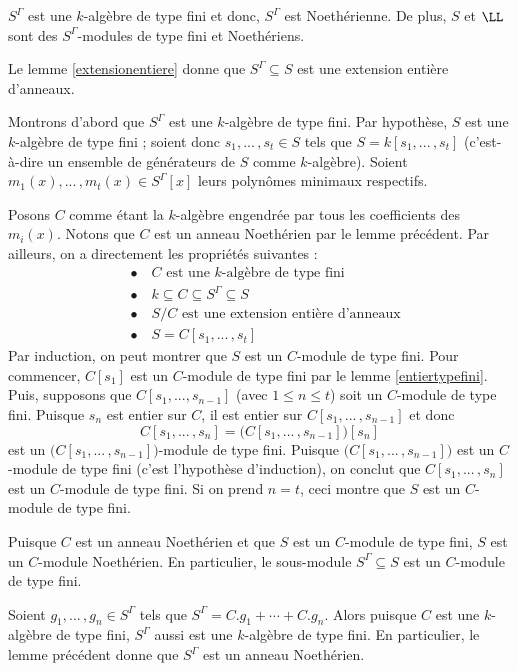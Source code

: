 \begin{Lem} \label{toutestnoetherien} $S^\Gamma$ est une $k$-algèbre de type fini et donc, $S^\Gamma$ est Noethérienne. De plus, $S$ et $\LL$ sont des $S^\Gamma$-modules de type fini et Noethériens.
\begin{pre} Le lemme \ref{extensionentiere} donne que $S^\Gamma \subseteq S$ est une extension entière d'anneaux.  

Montrons d'abord que $S^\Gamma$ est une $k$-algèbre de type fini. Par hypothèse, $S$ est une $k$-algèbre de type fini ; soient donc $s_1,...\,,s_t \in S$ tels que $S = k[s_1,...\,, s_t]$ (c'est-à-dire un ensemble de générateurs de $S$ comme $k$-algèbre). Soient $m_1(x),...\,,m_t(x) \in S^\Gamma [x]$ leurs polynômes minimaux respectifs.

Posons $C$ comme étant la $k$-algèbre engendrée par tous les coefficients des $m_i(x)$. Notons que $C$ est un anneau Noethérien par le lemme précédent. Par ailleurs, on a directement les propriétés suivantes :
\begin{align*}
&\bullet \quad C\text{ est une } k\text{-algèbre de type fini}\\
&\bullet \quad k \subseteq C \subseteq S^\Gamma \subseteq S\\
&\bullet \quad S / C \text{ est une extension entière d'anneaux}\\
&\bullet \quad S = C[s_1,...\,,s_t]
\end{align*}
Par induction, on peut montrer que $S$ est un $C$-module de type fini. Pour commencer, $C[s_1]$ est un $C$-module de type fini par le lemme \ref{entiertypefini}. Puis, supposons que $C[s_1,...,s_{n-1}]$ (avec $1 \leq n \leq t$) soit un $C$-module de type fini. Puisque $s_n$ est entier sur $C$, il est entier sur $C[s_1,...\,,s_{n-1}]$ et donc
$$ C[s_1,...\,, s_n] = \big(C[s_1,...\,,s_{n-1}]\big)[s_n] $$
est un $\big(C[s_1,...\,,s_{n-1}]\big)$-module de type fini. Puisque $\big(C[s_1,...\,,s_{n-1}]\big)$ est un $C$-module de type fini (c'est l'hypothèse d'induction), on conclut que $C[s_1,...\,, s_n]$ est un $C$-module de type fini. Si on prend $n = t$, ceci montre que $S$ est un $C$-module de type fini.

Puisque $C$ est un anneau Noethérien et que $S$ est un $C$-module de type fini, $S$ est un $C$-module Noethérien. En particulier, le sous-module $S^\Gamma \subseteq S$ est un $C$-module de type fini.

Soient $g_1,...\,,g_n \in S^\Gamma$ tels que $S^\Gamma = C.g_1 + \cdots + C.g_n$. Alors puisque $C$ est une $k$-algèbre de type fini, $S^\Gamma$ aussi est une $k$-algèbre de type fini. En particulier, le lemme précédent donne que $S^\Gamma$ est un anneau Noethérien.


\end{pre}
\end{Lem}
